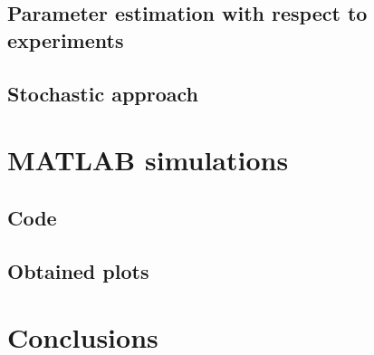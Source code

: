 \documentclass[fleqn,10pt]{SelfArx} %
\begin{document}
\subsection{Parameter estimation with respect to experiments}


\subsection{Stochastic approach}



\section{MATLAB simulations}
\subsection{Code}


\subsection{Obtained plots}


\section{Conclusions} %


\printbibliography
%
%

\end{document}
